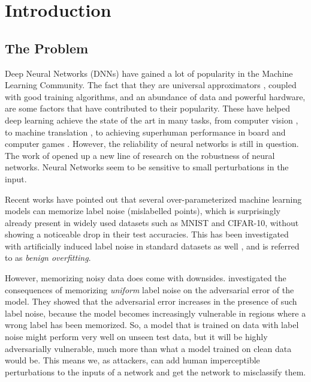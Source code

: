 \documentclass[12pt, oneside]{book}
\begin{document}
\tableofcontents

\chapter{Introduction}

\section{The Problem}

Deep Neural Networks (DNNs) have gained a lot of popularity in the Machine
Learning Community. The fact that they are universal approximators
\citep{hornik1989multilayer}, coupled with good training algorithms, and an
abundance of data and powerful hardware, are some factors that have contributed
to their popularity. These have helped deep learning achieve the state of the
art in many tasks, from computer vision \citep{imagenet}, to machine translation
\citep{seq2seq,attention-is-all-you-need}, to achieving superhuman performance
in board and computer games \citep{alpha-zero, starcraft}. However, the
reliability of neural networks is still in question. The work of \citet{42503}
opened up a new line of research on the robustness of neural networks. Neural
Networks seem to be sensitive to small perturbations in the input.

Recent works \citep{belkin2018understand,DBLP:journals/cacm/ZhangBHRV21} have
pointed out that several over-parameterized machine learning models can memorize
label noise (mislabelled points), which is surprisingly already present in
widely used datasets \citep{sanyal2021how} such as MNIST and CIFAR-10, without
showing a noticeable drop in their test accuracies. This has been investigated
with artificially induced label noise in standard datasets as well
\citep{sanyal2021how}, and is referred to as \emph{benign overfitting}.

However, memorizing noisy data does come with downsides. \citet{sanyal2021how}
investigated the consequences of memorizing \emph{uniform} label noise on the
adversarial error of the model. They showed that the adversarial error increases
in the presence of such label noise, because the model becomes increasingly
vulnerable in regions where a wrong label has been memorized. So, a model that
is trained on data with label noise might perform very well on unseen test data,
but it will be highly adversarially vulnerable, much more than what a model
trained on clean data would be. This means we, as attackers, can add human
imperceptible perturbations to the inputs of a network and get the network to
misclassify them.
\end{document}
